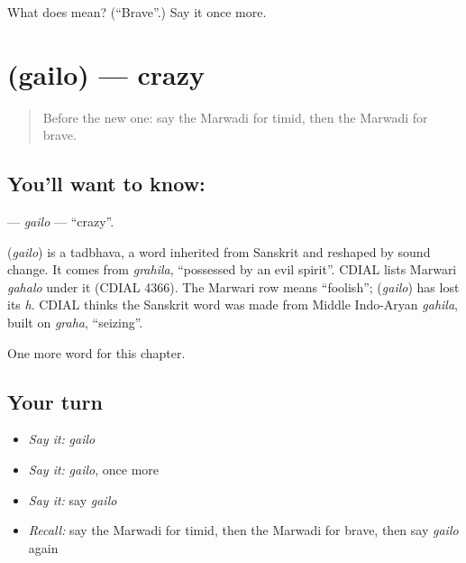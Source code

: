 \begin{tcolorbox}[breakable,colback=teal!4,colframe=teal!35!black,title={Before you move on}]
What does  mean? (\textquotedblleft{}Brave\textquotedblright{}.) Say it once more.
\end{tcolorbox}
\section[\texorpdfstring{\mw{गैलो} (gailo)}{गैलो (gailo)}]{ (gailo) — crazy}

\label{lesson:MW-C149-gailo}



\begin{quote}
Before the new one: say the Marwadi for timid, then the Marwadi for brave.
\end{quote}

\subsection*{You'll want to know: }
\textbf{} — \emph{gailo} — \textquotedblleft{}crazy\textquotedblright{}.

\begin{cousinweb}
\textbf{} (\emph{gailo}) is a tadbhava, a word inherited from Sanskrit and reshaped by sound change. It comes from \emph{grahila}, \textquotedblleft{}possessed by an evil spirit\textquotedblright{}. CDIAL lists Marwari \emph{gahalo} under it (CDIAL 4366). The Marwari row means \textquotedblleft{}foolish\textquotedblright{}; \textbf{} (\emph{gailo}) has lost its \emph{h}. CDIAL thinks the Sanskrit word was made from Middle Indo-Aryan \emph{gahila}, built on \emph{graha}, \textquotedblleft{}seizing\textquotedblright{}.
\end{cousinweb}

\begin{grammarlens}[title={What you've built}]
One more word for this chapter.
\end{grammarlens}

\subsection*{Your turn}
\begin{itemize}
\raggedright
  \item \emph{Say it:} \emph{gailo}
  \item \emph{Say it:} \emph{gailo}, once more
  \item \emph{Say it:} say \emph{gailo}
  \item \emph{Recall:} say the Marwadi for timid, then the Marwadi for brave, then say \emph{gailo} again
\end{itemize}

